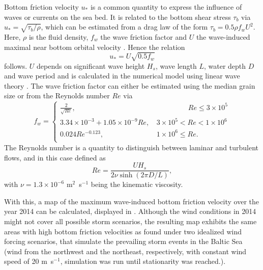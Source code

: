 Bottom friction velocity $u_\ast$ is a common quantity to express the influence 
of waves or currents on the sea bed. It is related to the bottom shear stress 
$\tau_b$ via $u_\ast = \sqrt{\tau_b \slash \rho}$, which can 
be estimated from a drag law of the form $\tau_b = 0.5 \rho f_w U^2$. Here, 
$\rho$ is the fluid 
density, $f_w$ the wave friction factor and $U$ the wave-induced
maximal near bottom orbital velocity \citep[][]{schwartz2006}. Hence the 
relation
\begin{equation}
 \label{ustar}
 u_\ast = U \sqrt{0.5 f_w}
\end{equation}
follows. $U$ depends on significant wave height $H_s$, wave length 
$L$, water depth $D$ and wave period and is calculated in the numerical 
model using linear wave theory \citep[][]{holthuijsen2007, schwartz2006}. The 
wave friction factor can either be estimated using the median grain size 
\citep[][]{swart1974, nielsen1992} or from the Reynolds number $Re$ 
\citep[][definition below]{nielsen1992, jonsson2004} via
\begin{equation}
 \label{fw}
 f_w = \left\{ \begin{array}{lll}
             \frac{2}{\sqrt{Re}}, & \qquad \qquad \; \,  Re \leq 3 \times 10^5 
\\
              3.34 \times 10^{-3} + 1.05 \times 10^{-9} Re, \, &3 \times 10^5 < 
							  Re < 1 \times 10^6 \\
	      0.024 Re^{-0.123}, \, &1 \times 10^6 \leq Re. \\
              \end{array} 
              \right. 
\end{equation}
The Reynolds number is a quantity to distinguish between laminar and turbulent 
flows, and in this case defined as
\begin{equation}
 \label{reynolds}
 Re = \frac{U H_s}{2 \nu \sinh (2 \pi D \slash L) },
\end{equation}
with $\nu = 1.3 \times 10^{-6}$ m$^2$~s$^{-1}$ being the kinematic viscosity.

With this, a map of the maximum wave-induced bottom friction velocity over the 
year 2014 can be calculated, displayed in . Although the wind 
conditions in 2014 might not cover all possible storm scenarios, the 
resulting map exhibits the same areas with high bottom friction velocities as 
found under two idealized wind forcing scenarios, that simulate the prevailing 
storm events in the Baltic Sea (wind from the northwest and the northeast, 
respectively, with constant wind speed of 20 m~s$^{-1}$, simulation was run 
until stationarity was reached.).

